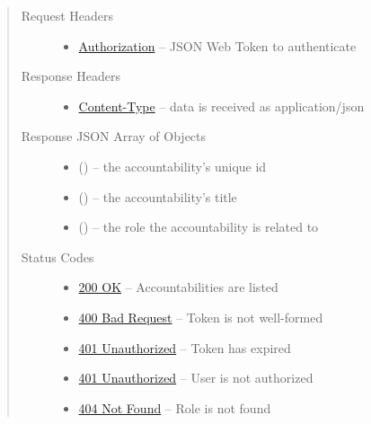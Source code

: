 \documentclass[letterpaper,10pt,english]{sphinxmanual}
\begin{document}
\begin{fulllineitems}
\begin{quote}
\begin{description}
\begin{itemize}
\end{itemize}

\item[{Request Headers}] \leavevmode\begin{itemize}
\item {} 
\href{http://tools.ietf.org/html/rfc7235\#section-4.2}{Authorization} -- JSON Web Token to authenticate

\end{itemize}

\item[{Response Headers}] \leavevmode\begin{itemize}
\item {} 
\href{http://tools.ietf.org/html/rfc7231\#section-3.1.1.5}{Content-Type} -- data is received as application/json

\end{itemize}

\item[{Response JSON Array of Objects}] \leavevmode\begin{itemize}
\item {} 
 () -- the accountability's unique id

\item {} 
 () -- the accountability's title

\item {} 
 () -- the role the accountability is related to

\end{itemize}

\item[{Status Codes}] \leavevmode\begin{itemize}
\item {} 
\href{http://www.w3.org/Protocols/rfc2616/rfc2616-sec10.html\#sec10.2.1}{200 OK} -- Accountabilities are listed

\item {} 
\href{http://www.w3.org/Protocols/rfc2616/rfc2616-sec10.html\#sec10.4.1}{400 Bad Request} -- Token is not well-formed

\item {} 
\href{http://www.w3.org/Protocols/rfc2616/rfc2616-sec10.html\#sec10.4.2}{401 Unauthorized} -- Token has expired

\item {} 
\href{http://www.w3.org/Protocols/rfc2616/rfc2616-sec10.html\#sec10.4.2}{401 Unauthorized} -- User is not authorized

\item {} 
\href{http://www.w3.org/Protocols/rfc2616/rfc2616-sec10.html\#sec10.4.5}{404 Not Found} -- Role is not found

\end{itemize}

\end{description}\end{quote}

\end{fulllineitems}
\end{document}
